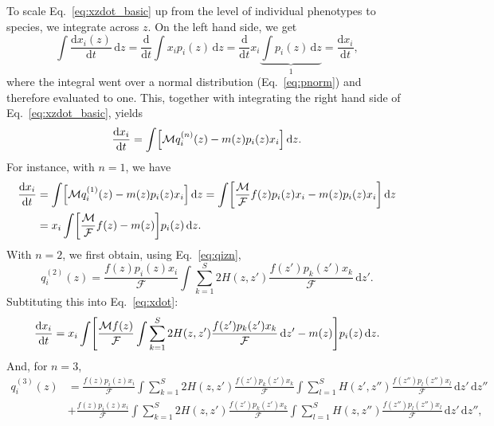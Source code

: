 \documentclass[11pt]{article}
\newcommand{\ud}{\text{d}}
\let\originalleft\left
\let\originalright\right
\renewcommand{\left}{\mathopen{}\mathclose\bgroup\originalleft}
\renewcommand{\right}{\aftergroup\egroup\originalright}
\begin{document}
To scale Eq.~\ref{eq:xzdot_basic} up from the level of individual phenotypes to species, we integrate across $z$. On the left hand side, we get
\begin{equation}
  \label{eq:xzdot_lhs}
  \int \frac{\ud x_i(z)}{\ud t} \,\ud z =
  \frac{\ud}{\ud t} \int x_i p_i(z) \,\ud z =
  \frac{\ud}{\ud t} x_i \underbrace{\int p_i(z) \,\ud z}_{1} =
  \frac{\ud x_i}{\ud t} ,
\end{equation}
where the integral went over a normal distribution (Eq.~\ref{eq:pnorm}) and therefore evaluated to one. This, together with integrating the right hand side of Eq.~\ref{eq:xzdot_basic}, yields
\begin{equation}
  \label{eq:xdot}
  \frac{\ud x_i}{\ud t} = \int \left[ \mathcal{M} q_i^{(n)}(z) -
    m(z) p_i(z) x_i \right] \,\ud z .
\end{equation}
For instance, with $n=1$, we have
\begin{equation}
  \label{eq:xdot_n1}
  \begin{split}
    \frac{\ud x_i}{\ud t} &=
    \int \left[ \mathcal{M} q_i^{(1)}(z) - m(z) p_i(z) x_i \right] \,\ud z =
    \int \left[ \frac{\mathcal{M}}{\mathcal{F}} f(z) p_i(z) x_i -
      m(z) p_i(z) x_i \right] \,\ud z
    \\ &= x_i \int \left[ \frac{\mathcal{M}}{\mathcal{F}} f(z) - m(z) \right]
    p_i(z) \,\ud z .
  \end{split}
\end{equation}
With $n=2$, we first obtain, using Eq.~\ref{eq:qizn},
\begin{equation}
  \label{eq:qiz_n2}
  q_i^{(2)}(z) = \frac{f(z) p_i(z) x_i}{\mathcal{F}}
  \int \sum_{k=1}^S 2 H(z,z') \frac{f(z') p_k(z') x_k}{\mathcal{F}} \,\ud z' .
\end{equation}
Subtituting this into Eq.~\ref{eq:xdot}:
\begin{equation}
  \label{eq:xdot_n2}
  \frac{\ud x_i}{\ud t} = x_i \int \left[ \frac{\mathcal{M} f(z)}{\mathcal{F}}
    \int \sum_{k=1}^S 2 H(z,z') \frac{f(z') p_k(z') x_k}{\mathcal{F}} \,\ud z' -
    m(z) \right] p_i(z) \,\ud z .
\end{equation}
And, for $n=3$,
\begin{equation}
  \label{eq:qiz_n3_1}
  \begin{split}
    q_i^{(3)}(z) &= \frac{f(z) p_i(z) x_i}{\mathcal{F}} \int \sum_{k=1}^S
    2 H(z,z') \frac{f(z') p_k(z') x_k}{\mathcal{F}} \int \sum_{l=1}^S H(z',z'')
    \frac{f(z'') p_l(z'') x_l}{\mathcal{F}} \,\ud z' \,\ud z''
    \\ &+ \frac{f(z) p_i(z) x_i}{\mathcal{F}} \int \sum_{k=1}^S
    2 H(z,z') \frac{f(z') p_k(z') x_k}{\mathcal{F}} \int \sum_{l=1}^S H(z,z'')
    \frac{f(z'') p_l(z'') x_l}{\mathcal{F}} \,\ud z' \,\ud z'' ,
  \end{split}
\end{equation}
\end{document}
